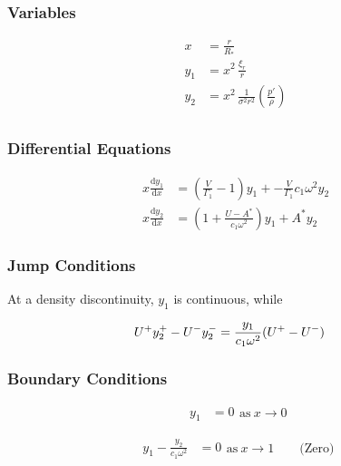 \documentclass[fleqn]{article}
\newcommand{\diff}{\ensuremath{\mathrm{d}}}
\newcommand{\Vg}{\ensuremath{\frac{V}{\Gamma_{1}}}}
\newcommand{\As}{\ensuremath{A^{\ast}}}
\newcommand{\Rstar}{\ensuremath{R_{\ast}}}
\begin{document}
\subsubsection*{Variables}

\begin{align*}
x     &= \frac{r}{\Rstar} \\
y_{1} &= x^{2}\, \frac{\xi_{r}}{r} \\
y_{2} &= x^{2}\, \frac{1}{\sigma^{2} r^{2}} \left( \frac{p'}{\rho} \right) \\
\end{align*}

\subsubsection*{Differential Equations}

\begin{align*}
x \frac{\diff y_{1}}{\diff x} &=
\left(\Vg - 1 \right) y_{1} +
- \Vg c_{1} \omega^{2} y_{2} \\
x \frac{\diff y_{2}}{\diff x} &=
\left(1 + \frac{U - \As}{c_{1} \omega^{2}} \right) y_{1} +
\As y_{2}
\end{align*}

\subsubsection*{Jump Conditions}

At a density discontinuity, $y_{1}$ is continuous, while

\begin{align*}
U^{\rm +} y_{2}^{+} - U^{-} y_{2}^{-} &= \frac{y_{1}}{c_{1}\omega^{2}} (U^{+} - U^{-})
\end{align*}

\subsubsection*{Boundary Conditions}

\begin{equation*}
\begin{aligned}
y_{1} &= 0
\end{aligned}
\text{as}\ x \rightarrow 0
\end{equation*}

\begin{equation*}
\begin{aligned}
y_{1} - \frac{y_{2}}{c_{1} \omega^{2}} &= 0
\end{aligned}
\text{as}\ x \rightarrow 1 \qquad \text{(Zero)}
\end{equation*}
\end{document}
